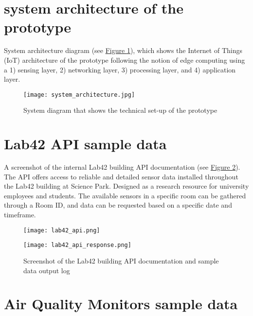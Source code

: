 \begin{appendices}
\section{system architecture of the prototype}
\label{appendix:architecture}

System architecture diagram (see \hyperref[fig:system-diagram]{Figure \ref{fig:system-diagram}}), which shows the Internet of Things (IoT) architecture of the prototype following the notion of edge computing using a 1) sensing layer, 2) networking layer, 3) processing layer, and 4) application layer.

\begin{figure}[H]
    \centering
    \texttt{[image: system\_architecture.jpg]}
    \caption{System diagram that shows the technical set-up of the prototype}
    \label{fig:system-diagram}
\end{figure}

\section{Lab42 API sample data}
\label{appendix:api-sample-data}

A screenshot of the internal Lab42 building API documentation (see \hyperref[fig:api-documentation]{Figure \ref{fig:api-documentation}}). The API offers access to reliable and detailed sensor data installed throughout the Lab42 building at Science Park. Designed as a research resource for university employees and students. The available sensors in a specific room can be gathered through a Room ID, and data can be requested based on a specific date and timeframe.


\begin{figure}[H]
    \centering
    \begin{minipage}{0.7\textwidth}
        \centering
        \texttt{[image: lab42\_api.png]}
    \end{minipage}%
    \begin{minipage}{0.3\textwidth}
        \centering
        \texttt{[image: lab42\_api\_response.png]}
    \end{minipage}
    \caption{Screenshot of the Lab42 building API documentation and sample data output log}
    \label{fig:api-documentation}
\end{figure}

\newpage

\section{Air Quality Monitors sample data}
\label{appendix:monitors}


\end{appendices}
